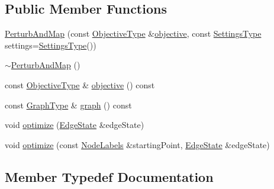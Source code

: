 \subsection*{Public Member Functions}
\begin{DoxyCompactItemize}
\item 
\hyperlink{classnifty_1_1graph_1_1opt_1_1multicut_1_1PerturbAndMap_a20299dc0f4de9c1dafe0db8f510ba52a}{Perturb\+And\+Map} (const \hyperlink{classnifty_1_1graph_1_1opt_1_1multicut_1_1PerturbAndMap_ac76585ed44501350bf31fbcc2d02078e}{Objective\+Type} \&\hyperlink{classnifty_1_1graph_1_1opt_1_1multicut_1_1PerturbAndMap_a00e3f702037149e758472f3ddd7a45b1}{objective}, const \hyperlink{structnifty_1_1graph_1_1opt_1_1multicut_1_1PerturbAndMap_1_1SettingsType}{Settings\+Type} settings=\hyperlink{structnifty_1_1graph_1_1opt_1_1multicut_1_1PerturbAndMap_1_1SettingsType}{Settings\+Type}())
\item 
\hyperlink{classnifty_1_1graph_1_1opt_1_1multicut_1_1PerturbAndMap_a7732d789858c6f4c1f31f5da7f5525e5}{$\sim$\+Perturb\+And\+Map} ()
\item 
const \hyperlink{classnifty_1_1graph_1_1opt_1_1multicut_1_1PerturbAndMap_ac76585ed44501350bf31fbcc2d02078e}{Objective\+Type} \& \hyperlink{classnifty_1_1graph_1_1opt_1_1multicut_1_1PerturbAndMap_a00e3f702037149e758472f3ddd7a45b1}{objective} () const
\item 
const \hyperlink{classnifty_1_1graph_1_1opt_1_1multicut_1_1PerturbAndMap_a4284b4d29c3e770b0e107fa794b3d32e}{Graph\+Type} \& \hyperlink{classnifty_1_1graph_1_1opt_1_1multicut_1_1PerturbAndMap_ac92f78f62353114a15c9b5069b82d9ed}{graph} () const
\item 
void \hyperlink{classnifty_1_1graph_1_1opt_1_1multicut_1_1PerturbAndMap_afeb721d1af08fa11cee43463b949e911}{optimize} (\hyperlink{classnifty_1_1graph_1_1opt_1_1multicut_1_1PerturbAndMap_a82a5b6a74aac0c8bc47d5ccfbd06aaf2}{Edge\+State} \&edge\+State)
\item 
void \hyperlink{classnifty_1_1graph_1_1opt_1_1multicut_1_1PerturbAndMap_ad5d4f689b41b573677862a2ed0764d40}{optimize} (const \hyperlink{classnifty_1_1graph_1_1opt_1_1multicut_1_1PerturbAndMap_a7ea0921a7e9ee7c29772d615a1f0de89}{Node\+Labels} \&starting\+Point, \hyperlink{classnifty_1_1graph_1_1opt_1_1multicut_1_1PerturbAndMap_a82a5b6a74aac0c8bc47d5ccfbd06aaf2}{Edge\+State} \&edge\+State)
\end{DoxyCompactItemize}


\subsection{Member Typedef Documentation}
\mbox{\label{classnifty_1_1graph_1_1opt_1_1multicut_1_1PerturbAndMap_a82a5b6a74aac0c8bc47d5ccfbd06aaf2}} 
